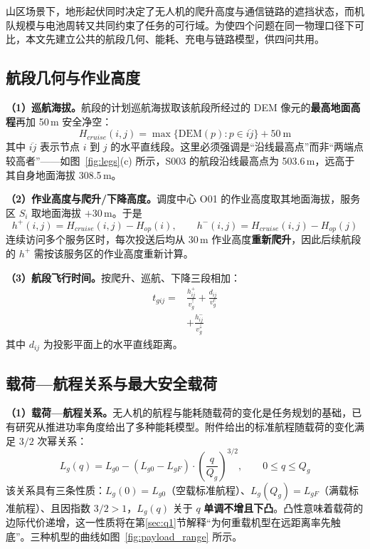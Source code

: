 
山区场景下，地形起伏同时决定了无人机的爬升高度与通信链路的遮挡状态，而机队规模与电池周转又共同约束了任务的可行域。为使四个问题在同一物理口径下可比，本文先建立公共的航段几何、能耗、充电与链路模型，供四问共用。

\subsection{航段几何与作业高度}

\textbf{（1）巡航海拔。}航段的计划巡航海拔取该航段所经过的 DEM 像元的\textbf{最高地面高程}再加 50\,m 安全净空：
\begin{equation}
	\label{eq:1}
	H_{cruise}(i,j)=\max\{\mathrm{DEM}(p):p\in\overline{ij}\}+50\ \mathrm{m}
\end{equation}
其中 $\overline{ij}$ 表示节点 $i$ 到 $j$ 的水平直线段。这里必须强调是“沿线最高点”而非“两端点较高者”——如图~\ref{fig:legs}(c) 所示，S003 的航段沿线最高点为 503.6\,m，远高于其自身地面海拔 308.5\,m。

\textbf{（2）作业高度与爬升/下降高度。}调度中心 O01 的作业高度取其地面海拔，服务区 $S_i$ 取地面海拔 $+30$\,m。于是
\begin{equation}
	\label{eq:2}
	h^{+}(i,j)=H_{cruise}(i,j)-H_{op}(i),\qquad
	h^{-}(i,j)=H_{cruise}(i,j)-H_{op}(j)
\end{equation}
连续访问多个服务区时，每次投送后均从 30\,m 作业高度\textbf{重新爬升}，因此后续航段的 $h^{+}$ 需按该服务区的作业高度重新计算。

\textbf{（3）航段飞行时间。}按爬升、巡航、下降三段相加：
\begin{equation}
	\label{eq:3}
	\begin{aligned}
		t_{gij}={}&\frac{h^{+}_{ij}}{v_{g}^{\uparrow}}+\frac{d_{ij}}{v_{g}^{c}}\\
		        &+\frac{h^{-}_{ij}}{v_{g}^{\downarrow}}
	\end{aligned}
\end{equation}
其中 $d_{ij}$ 为投影平面上的水平直线距离。

\subsection{载荷—航程关系与最大安全载荷}

\textbf{（1）载荷—航程关系。}无人机的航程与能耗随载荷的变化是任务规划的基础，已有研究从推进功率角度给出了多种能耗模型\cite{dai2022uavenergy}。附件给出的标准航程随载荷的变化满足 $3/2$ 次幂关系：
\begin{equation}
	\label{eq:4}
	L_{g}(q)=L_{g0}-(L_{g0}-L_{gF})\cdot\left(\frac{q}{Q_{g}}\right)^{3/2},\qquad 0\le q\le Q_{g}
\end{equation}
该关系具有三条性质：$L_{g}(0)=L_{g0}$（空载标准航程）、$L_{g}(Q_{g})=L_{gF}$（满载标准航程）、且因指数 $3/2>1$，$L_{g}(q)$ 关于 $q$ \textbf{单调不增且下凸}。凸性意味着载荷的边际代价递增，这一性质将在第\ref{sec:q1}节解释“为何重载机型在远距离率先触底”。三种机型的曲线如图~\ref{fig:payload_range} 所示。

